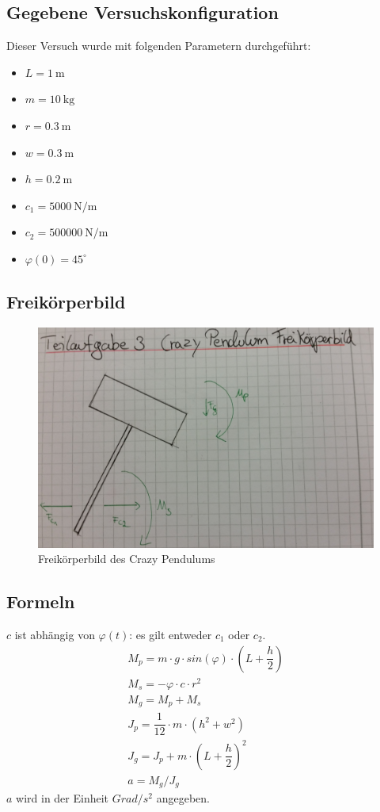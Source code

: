 \documentclass[]{scrartcl}
\begin{document}
\subsection{Gegebene Versuchskonfiguration}
Dieser Versuch wurde mit folgenden Parametern durchgeführt:
\begin{itemize}
\item $L = \SI{1}{\metre}$
\item $m = \SI{10}{\kg}$
\item $r = \SI{0.3}{\metre}$
\item $w = \SI{0.3}{\metre}$
\item $h = \SI{0.2}{\metre}$
\item $c_{1} = \SI[per-mode=fraction]{5000}{\newton\per\metre}$
\item $c_{2} = \SI[per-mode=fraction]{500 000}{\newton\per\metre}$
\item $\varphi(0) = 45^\circ$
\end{itemize}

\subsection{Freikörperbild}

\begin{figure}[H]
\centering
\includegraphics[width=1\linewidth]{./3_Freikoerperbild}
\caption{Freikörperbild des Crazy Pendulums}
\label{fig:3_Freikoerperbild}
\end{figure}

\subsection{Formeln}
$c$ ist abhängig von $\varphi(t)$: es gilt entweder $c_{1}$ oder $c_{2}$.
\begin{align}
M_{p} = m \cdot g \cdot sin(\varphi) \cdot (L + \dfrac{h}{2})\\
M_{s} = -\varphi \cdot c \cdot r^2\\
M_{g} = M_{p} + M_{s}\\
J_{p} = \dfrac{1}{12} \cdot m \cdot (h^2 + w^2)\\
J_{g} = J_{p} + m \cdot (L + \dfrac{h}{2})^2\\
a = M_{g}/J_{g}
\end{align}
$a$ wird in der Einheit $Grad/s^2$ angegeben.
\end{document}

